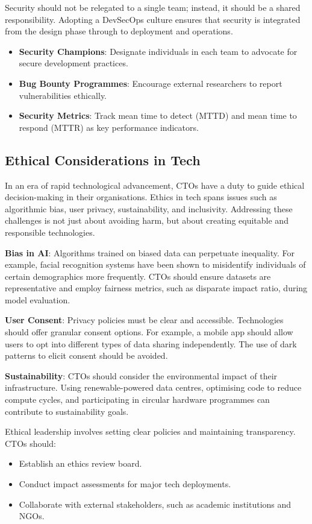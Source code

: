 Security should not be relegated to a single team; instead, it should be a shared responsibility. Adopting a DevSecOps culture ensures that security is integrated from the design phase through to deployment and operations.

\begin{itemize}
    \item \textbf{Security Champions}: Designate individuals in each team to advocate for secure development practices.
    \item \textbf{Bug Bounty Programmes}: Encourage external researchers to report vulnerabilities ethically.
    \item \textbf{Security Metrics}: Track mean time to detect (MTTD) and mean time to respond (MTTR) as key performance indicators.
\end{itemize}

\subsection{Ethical Considerations in Tech}

In an era of rapid technological advancement, CTOs have a duty to guide ethical decision-making in their organisations. Ethics in tech spans issues such as algorithmic bias, user privacy, sustainability, and inclusivity. Addressing these challenges is not just about avoiding harm, but about creating equitable and responsible technologies.

\textbf{Bias in AI}: Algorithms trained on biased data can perpetuate inequality. For example, facial recognition systems have been shown to misidentify individuals of certain demographics more frequently. CTOs should ensure datasets are representative and employ fairness metrics, such as disparate impact ratio, during model evaluation.

\textbf{User Consent}: Privacy policies must be clear and accessible. Technologies should offer granular consent options. For example, a mobile app should allow users to opt into different types of data sharing independently. The use of dark patterns to elicit consent should be avoided.

\textbf{Sustainability}: CTOs should consider the environmental impact of their infrastructure. Using renewable-powered data centres, optimising code to reduce compute cycles, and participating in circular hardware programmes can contribute to sustainability goals.

Ethical leadership involves setting clear policies and maintaining transparency. CTOs should:
\begin{itemize}
    \item Establish an ethics review board.
    \item Conduct impact assessments for major tech deployments.
    \item Collaborate with external stakeholders, such as academic institutions and NGOs.
\end{itemize}

